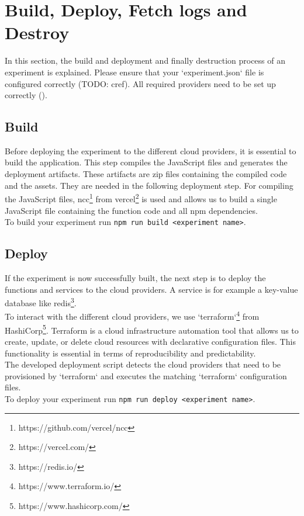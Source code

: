 \documentclass[../main.tex]{subfiles}
\begin{document}
\section{Build, Deploy, Fetch logs and Destroy}\label{sec:builddeployanddestroy}
In this section, the build and deployment and finally destruction process of an experiment is explained. Please ensure that your `experiment.json` file is configured correctly (TODO: cref). All required providers need to be set up correctly ().

\subsection{Build}\label{sec:build}
Before deploying the experiment to the different cloud providers, it is essential to build the application. This step compiles the JavaScript files and generates the deployment artifacts. These artifacts are zip files containing the compiled code and the assets. They are needed in the following deployment step. For compiling the JavaScript files, ncc\footnote{https://github.com/vercel/ncc} from vercel\footnote{https://vercel.com/} is used and allows us to build a single JavaScript file containing the function code and all npm dependencies.\\
To build your experiment run \texttt{npm run build <experiment name>}.

\subsection{Deploy}\label{sec:deploy}
If the experiment is now successfully built, the next step is to deploy the functions and services to the cloud providers. A service is for example a key-value database like redis\footnote{https://redis.io/}. \\
To interact with the different cloud providers, we use `terraform`\footnote{https://www.terraform.io/} from HashiCorp\footnote{https://www.hashicorp.com/}. Terraform is a cloud infrastructure automation tool that allows us to create, update, or delete cloud resources with declarative configuration files. This functionality is essential in terms of reproducibility and predictability.\\
The developed deployment script detects the cloud providers that need to be provisioned by `terraform` and executes the matching `terraform` configuration files.\\
To deploy your experiment run \texttt{npm run deploy <experiment name>}.\\
\end{document}
